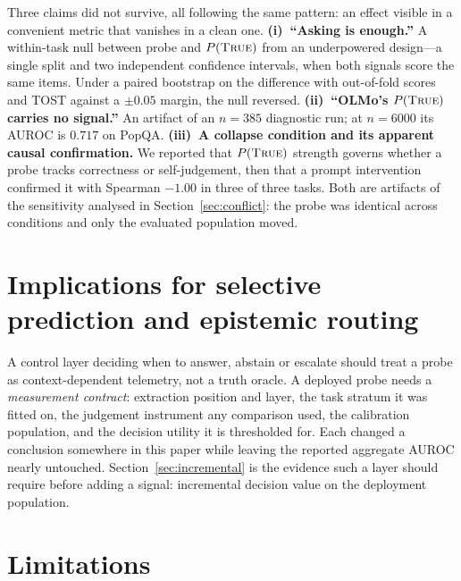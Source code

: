 \documentclass[10pt]{article}
\newcommand{\ptrue}{P(\textsc{True})}
\begin{document}
Three claims did not survive, all following the same pattern: an effect visible in a convenient
metric that vanishes in a clean one.
\textbf{(i)~``Asking is enough.''} A within-task null between probe and $\ptrue{}$ from an
underpowered design---a single split and two independent confidence intervals, when both signals
score the same items. Under a paired bootstrap on the difference with out-of-fold scores and TOST
against a $\pm0.05$ margin, the null reversed.
\textbf{(ii)~``OLMo's $\ptrue{}$ carries no signal.''} An artifact of an $n{=}385$ diagnostic run;
at $n{=}6000$ its AUROC is $0.717$ on PopQA.
\textbf{(iii)~A collapse condition and its apparent causal confirmation.} We reported that
$\ptrue{}$ strength governs whether a probe tracks correctness or self-judgement, then that a prompt
intervention confirmed it with Spearman $-1.00$ in three of three tasks. Both are artifacts of the
sensitivity analysed in Section~\ref{sec:conflict}: the probe was identical across conditions and
only the evaluated population moved.

\section{Implications for selective prediction and epistemic routing}

A control layer deciding when to answer, abstain or escalate should treat a probe as
context-dependent telemetry, not a truth oracle. A deployed probe needs a \emph{measurement
contract}: extraction position and layer, the task stratum it was fitted on, the judgement
instrument any comparison used, the calibration population, and the decision utility it is
thresholded for. Each changed a conclusion somewhere in this paper while leaving the reported
aggregate AUROC nearly untouched. Section~\ref{sec:incremental} is the evidence such a layer should
require before adding a signal: incremental decision value on the deployment population.

\section{Limitations}
\end{document}
